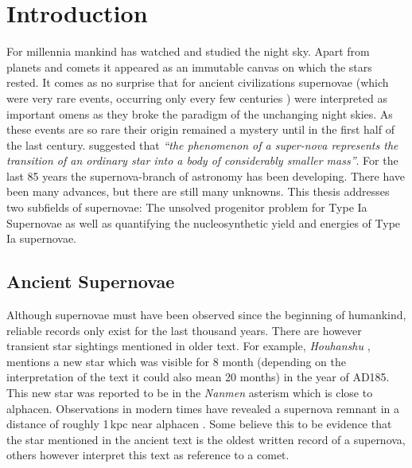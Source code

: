\chapter{Introduction}
\label{chap:intro}

For millennia mankind has watched and studied the night sky. Apart from planets and comets it appeared as an immutable canvas on which the stars rested. It comes as no surprise that for ancient civilizations supernovae (which were very rare events, occurring only every few centuries ) were interpreted as important omens as they broke the paradigm of the unchanging night skies. As these events are so rare their origin remained a mystery until in the first half of the last century. \citet{1934PNAS...20..254B} suggested that \textit{``the phenomenon of a super-nova represents the transition of an ordinary star into a body of considerably smaller mass''}. For the last 85 years the supernova-branch of astronomy has been developing. There have been many advances, but there are still many unknowns. This thesis addresses two subfields of supernovae: The unsolved progenitor problem for Type Ia Supernovae as well as quantifying the nucleosynthetic yield and energies of Type Ia supernovae.


\section{Ancient Supernovae}
\label{sec:ancientsn}
Although supernovae must have been observed since the beginning of humankind, reliable records only exist for the last thousand years. There are however transient star sightings mentioned in older text. For example, \textit{Houhanshu} \citep{2006ChJAA...6..635Z}, mentions a new star which was visible for 8 month (depending on the interpretation of the text it could also mean 20 months) in the year of AD185. This new star was reported to be in the \textit{Nanmen} asterism which is close to \gls{alphacen}.  Observations in modern times have revealed a supernova remnant in a distance of roughly 1\,kpc near \gls{alphacen} \citep{2006ChJAA...6..635Z}. Some believe this to be evidence that the star mentioned in the ancient text is  the oldest written record of a supernova, others however interpret this text as reference to a comet. 

